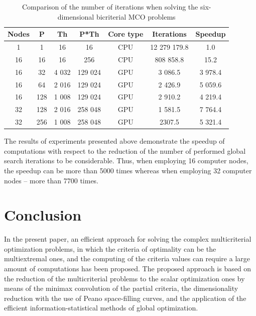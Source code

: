 \documentclass[runningheads]{llncs}
\begin{document}
\begin{table}[htbp]
\centering
\caption{Comparison of the number of iterations when solving the six-dimensional bicriterial MCO problems}
\label{tab:03}
\begin{tabular}{ccccccc}
\hline
\textbf{Nodes} & \textbf{P} & \textbf{Th} & \textbf{P*Th} & \textbf{Core type} & \textbf{Iterations} & \textbf{Speedup} \\ \hline
1              & 1          & 16          & 16            & CPU                                                           & 12 279 179.8        & 1.0              \\
16             & 16         & 16          & 256           & CPU                                                           & 808 858.8           & 15.2             \\
16             & 32         & 4 032       & 129 024       & GPU                                                           & 3 086.5             & 3 978.4          \\
16             & 64         & 2 016       & 129 024       & GPU                                                           & 2 426.9             & 5 059.6          \\
16             & 128        & 1 008       & 129 024       & GPU                                                           & 2 910.2             & 4 219.4          \\
32             & 128        & 2 016       & 258 048       & GPU                                                           & 1 581.5             & 7 764.4          \\
32             & 256        & 1 008       & 258 048       & GPU                                                           & 2307.5              & 5 321.4          \\ \hline
\end{tabular}
\end{table}

The results of experiments presented above demonstrate the speedup of computations with respect to the reduction of the number of performed global search iterations to be considerable. Thus, when employing 16 computer nodes, the speedup can be more than 5000 times whereas when employing 32 computer nodes -- more than 7700 times.

\section{Conclusion}
In the present paper, an efficient approach for solving the complex multicriterial optimization problems, in which the criteria of optimality can be the multiextremal ones, and the computing of the criteria values can require a large amount of computations has been proposed. The proposed approach is based on the reduction of the multicriterial problems to the scalar optimization ones by means of the minimax convolution of the partial criteria, the dimensionality reduction with the use of Peano space-filling curves, and the application of the efficient information-statistical methods of global optimization. 
\end{document}
